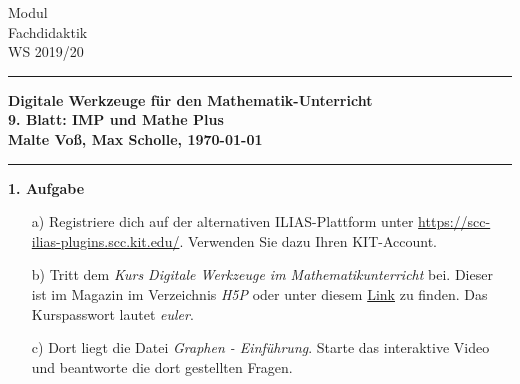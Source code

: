 \documentclass[a4paper,11pt]{scrreprt} %
\theoremstyle{definition} %
\begin{document}
%
\hfill \parbox{22mm}
{ 
Modul \\ Fachdidaktik \\ WS 2019/20 
}

\rule{\textwidth}{1pt}                                   %
%
\begin{center}
\textbf{
Digitale Werkzeuge für den Mathematik-Unterricht \\[1ex] %
%
{
\Large 9. Blatt:  \glqq IMP und Mathe Plus\grqq } \\[1ex]
%
%
Malte Vo\ss, Max Scholle, \today
}
\end{center}
% 
\rule{\textwidth}{1pt}                                 %
\vspace*{.5cm} 
 
\textbf{1. Aufgabe}
\begin{enumerate}
    \item[a)] 
        Registriere dich auf der alternativen ILIAS-Plattform unter
        \url{https://scc-ilias-plugins.scc.kit.edu/}. 
        Verwenden Sie dazu Ihren KIT-Account.

    \item[b)]
        Tritt dem \emph{Kurs Digitale Werkzeuge im Mathematikunterricht} bei.
        Dieser ist im Magazin im Verzeichnis \emph{H5P} oder unter diesem 
        \href{https://scc-ilias-plugins.scc.kit.edu/goto.php?target=crs_5451&client_id=pilot}{Link}
        zu finden.
        Das Kurspasswort lautet \emph{euler}.

    \item[c)]
        Dort liegt die Datei \emph{Graphen - Einführung}. 
        Starte das interaktive Video und beantworte die dort gestellten Fragen.
\end{enumerate}
%

\vspace{3ex}
\end{document}
